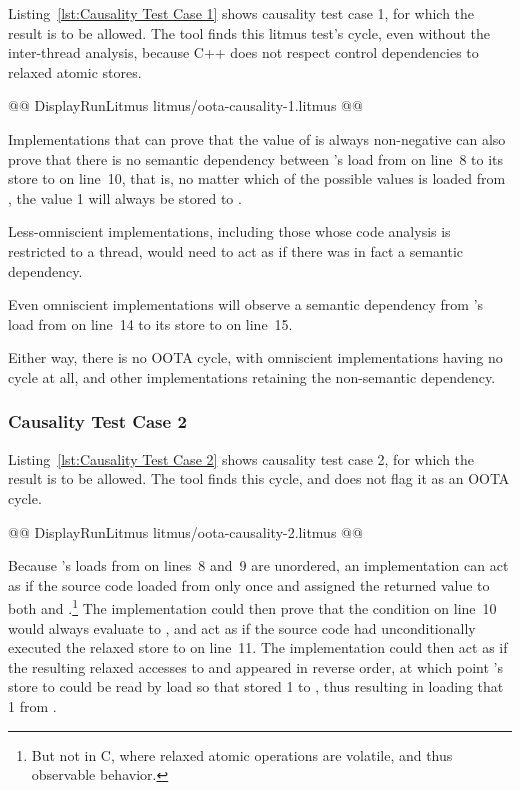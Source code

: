 \documentclass[10]{article}
\begin{document}
Listing~\ref{lst:Causality Test Case 1}
shows causality test case 1, for which the  result
is to be allowed.
The  tool finds this litmus test's cycle, even without the
inter-thread analysis, because C++ does not respect control dependencies
to relaxed atomic stores.

\begin{listing}[tbp]
@@ DisplayRunLitmus litmus/oota-causality-1.litmus @@
\caption{Causality Test Case 1}
\label{lst:Causality Test Case 1}
\end{listing}

Implementations that can prove that the value of  is always
non-negative can also prove that there is no semantic dependency between
's load from  on line~8 to its store to  on line~10,
that is, no matter which of the possible values is loaded from ,
the value 1 will always be stored to .

Less-omniscient implementations, including those whose code analysis
is restricted to a thread, would need to act as if there was in fact a
semantic dependency.

Even omniscient implementations will observe a semantic dependency from
's load from  on line~14 to its store to  on line~15.

Either way, there is no OOTA cycle, with omniscient implementations
having no cycle at all, and other implementations retaining the
non-semantic dependency.

\subsubsection{Causality Test Case 2}
\label{app:Causality Test Case 2}

Listing~\ref{lst:Causality Test Case 2}
shows causality test case 2, for which the  result
is to be allowed.
The  tool finds this cycle, and does not flag it as an OOTA cycle.

\begin{listing}[tbp]
@@ DisplayRunLitmus litmus/oota-causality-2.litmus @@
\caption{Causality Test Case 2}
\label{lst:Causality Test Case 2}
\end{listing}

Because 's loads from  on lines~8 and~9 are unordered,
an implementation can act as if the source code loaded from  only
once and assigned the returned value to both  and .\footnote{
	But not in C, where relaxed atomic operations are volatile,
	and thus observable behavior.}
The implementation could then prove that the condition on line~10
would always evaluate to , and act as if the source code had
unconditionally executed the relaxed store to  on line~11.
The implementation could then act as if the resulting relaxed accesses
to  and  appeared in reverse order, at which point
's store to  could be read by  load so that
 stored 1 to , thus resulting in  loading
that 1 from .
\end{document}
